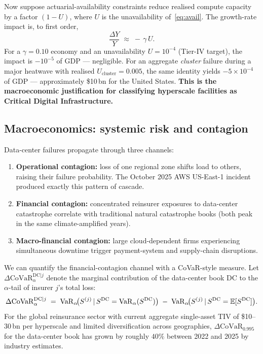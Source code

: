 Now suppose actuarial-availability constraints reduce realised compute
capacity by a factor $(1-U)$, where $U$ is the unavailability
of~\eqref{eq:avail}. The growth-rate impact is, to first order,
\begin{equation}\label{eq:gdp-impact}
   \frac{\Delta Y}{Y} \;\approx\; -\,\gamma\, U.
\end{equation}
For a $\gamma=0.10$ economy and an unavailability $U=10^{-4}$
(Tier-IV target), the impact is $-10^{-5}$ of GDP --- negligible. For
an aggregate \emph{cluster} failure during a major heatwave with
realised $U_{\mathrm{cluster}}=0.005$, the same identity yields
$-5\times 10^{-4}$ of GDP --- approximately \$10\,bn for the United
States. \textbf{This is the macroeconomic justification for
classifying hyperscale facilities as Critical Digital
Infrastructure.}

\subsection{Macroeconomics: systemic risk and contagion}\label{ss:systemic}

Data-center failures propagate through three channels:
\begin{enumerate}[leftmargin=*,nosep]
   \item \textbf{Operational contagion:} loss of one regional zone
         shifts load to others, raising their failure probability.
         The October 2025 AWS US-East-1 incident produced exactly this
         pattern of cascade.
   \item \textbf{Financial contagion:} concentrated reinsurer exposures
         to data-center catastrophe correlate with traditional natural
         catastrophe books (both peak in the same climate-amplified
         years).
   \item \textbf{Macro-financial contagion:} large cloud-dependent
         firms experiencing simultaneous downtime trigger payment-system
         and supply-chain disruptions.
\end{enumerate}
We can quantify the financial-contagion channel with a CoVaR-style
measure. Let $\Delta\mathrm{CoVaR}^{\mathrm{DC}|j}_{\alpha}$ denote
the marginal contribution of the data-center book $\mathrm{DC}$ to the
$\alpha$-tail of insurer $j$'s total loss:
\begin{equation}\label{eq:covar}
   \Delta\mathrm{CoVaR}^{\mathrm{DC}|j}_{\alpha}
   \;=\; \operatorname{VaR}_{\alpha}\!\bigl(S^{(j)}\,\vert\, S^{\mathrm{DC}}=\operatorname{VaR}_{\alpha}(S^{\mathrm{DC}})\bigr)
       \;-\; \operatorname{VaR}_{\alpha}\!\bigl(S^{(j)}\,\vert\, S^{\mathrm{DC}}=\mathbb{E}[S^{\mathrm{DC}}]\bigr).
\end{equation}
For the global reinsurance sector with current aggregate single-asset
TIV of \$10--30\,bn per hyperscale and limited diversification across
geographies, $\Delta\mathrm{CoVaR}_{0.995}$ for the data-center book
has grown by roughly $40\%$ between 2022 and 2025 by industry
estimates.

